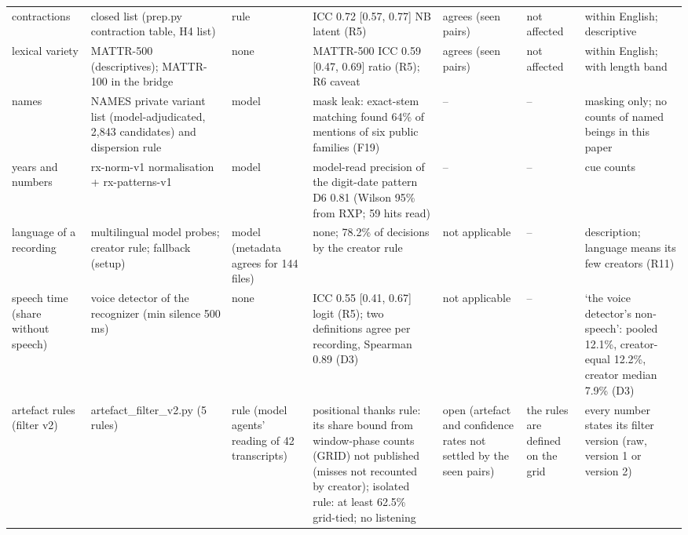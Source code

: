 {\begin{tabular}{@{}p{}p{}p{}p{}p{}p{}p{}@{}}
contractions & closed list (prep.py contraction table, H4 list) & rule & ICC 0.72 [0.57, 0.77] NB latent (R5) & agrees (seen pairs) & not affected & within English; descriptive \\
lexical variety & MATTR-500 (descriptives); MATTR-100 in the bridge & none & MATTR-500 ICC 0.59 [0.47, 0.69] ratio (R5); R6 caveat & agrees (seen pairs) & not affected & within English; with length band \\
names & NAMES private variant list (model-adjudicated, 2,843 candidates) and dispersion rule & model & mask leak: exact-stem matching found 64\% of mentions of six public families (F19) & -- & -- & masking only; no counts of named beings in this paper \\
years and numbers & rx-norm-v1 normalisation + rx-patterns-v1 & model & model-read precision of the digit-date pattern D6 0.81 (Wilson 95\% from RXP; 59 hits read) & -- & -- & cue counts \\
language of a recording & multilingual model probes; creator rule; fallback (setup) & model (metadata agrees for 144 files) & none; 78.2\% of decisions by the creator rule & not applicable & -- & description; language means its few creators (R11) \\
speech time (share without speech) & voice detector of the recognizer (min silence 500 ms) & none & ICC 0.55 [0.41, 0.67] logit (R5); two definitions agree per recording, Spearman 0.89 (D3) & not applicable & -- & `the voice detector's non-speech': pooled 12.1\%, creator-equal 12.2\%, creator median 7.9\% (D3) \\
artefact rules (filter v2) & artefact\_filter\_v2.py (5 rules) & rule (model agents' reading of 42 transcripts) & positional thanks rule: its share bound from window-phase counts (GRID) not published (misses not recounted by creator); isolated rule: at least 62.5\% grid-tied; no listening & open (artefact and confidence rates not settled by the seen pairs) & the rules are defined on the grid & every number states its filter version (raw, version 1 or version 2) \\
\bottomrule
\end{tabular}}

